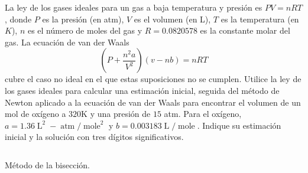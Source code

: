 \begin{questions}
\begin{multicols}{2}
    \end{multicols}


    \question

    La ley de los gases ideales para un gas a baja temperatura y
    presión es $PV=nRT$, donde $P$ es la presión (en atm), $V$ es el
    volumen (en L), $T$ es la temperatura (en $K$), $n$ es el número
    de moles del gas y $R=0.0820578$ es la constante molar del gas.
    La ecuación de van der Waals
    \begin{equation*}
        \left(P+\frac{n^{2}a}{V^{2}}\right)
        \left(v-nb\right)
        =nRT
    \end{equation*}
    cubre el caso no ideal en el que estas suposiciones no se cumplen.
    Utilice la ley de los gases ideales para calcular una estimación
    inicial, seguida del método de Newton aplicado a la ecuación de
    van der Waals para encontrar el volumen de un mol de oxígeno a
    $320$K y una presión de $15$ atm.
    Para el oxígeno,
    $a=1.36\operatorname{L}^{2}-\operatorname{atm}/\operatorname{mole}^{2}$
    y $b=0.003183\operatorname{L}/\operatorname{mole}$.
    Indique su estimación inicial y la solución con tres dígitos
    significativos.

    \begin{listing}[ht!]
        \tiny
        \centering
        \inputminted[linenos,highlightlines={7-35}]{octave}{bisect.m}
        \caption{Método de la bisección.}
    \end{listing}


\end{questions}
